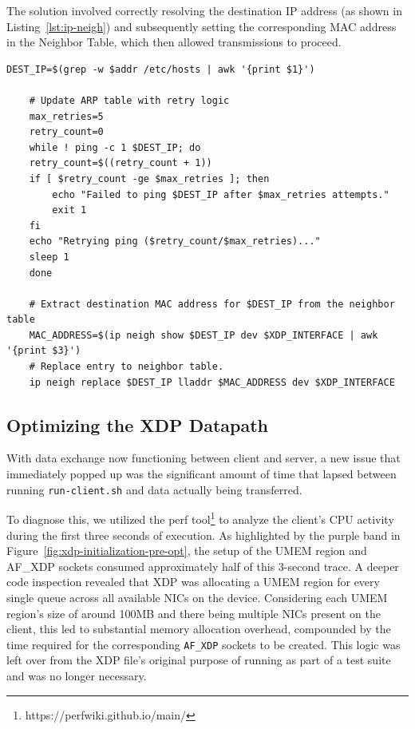 The solution involved correctly resolving the destination IP address (as shown in Listing~\ref{lst:ip-neigh}) and subsequently setting the corresponding MAC address in the Neighbor Table, which then allowed transmissions to proceed.

\begin{lstlisting}[caption={Hardcoding the IP and MAC address pair within the neighbor table}, label={lst:ip-neigh}]
    DEST_IP=$(grep -w $addr /etc/hosts | awk '{print $1}')

    # Update ARP table with retry logic
    max_retries=5
    retry_count=0
    while ! ping -c 1 $DEST_IP; do
    retry_count=$((retry_count + 1))
    if [ $retry_count -ge $max_retries ]; then
        echo "Failed to ping $DEST_IP after $max_retries attempts."
        exit 1
    fi
    echo "Retrying ping ($retry_count/$max_retries)..."
    sleep 1
    done

    # Extract destination MAC address for $DEST_IP from the neighbor table
    MAC_ADDRESS=$(ip neigh show $DEST_IP dev $XDP_INTERFACE | awk '{print $3}')
    # Replace entry to neighbor table.
    ip neigh replace $DEST_IP lladdr $MAC_ADDRESS dev $XDP_INTERFACE
\end{lstlisting}

\subsection{Optimizing the XDP Datapath}
\label{subsec:optimizing-xdp}
With data exchange now functioning between client and server, a new issue that immediately popped up was the significant amount of time that lapsed between running \texttt{run-client.sh} and data actually being transferred.

To diagnose this, we utilized the perf tool\footnote{https://perfwiki.github.io/main/} to analyze the client's \ac{CPU} activity during the first three seconds of execution. As highlighted by the purple band in Figure~\ref{fig:xdp-initialization-pre-opt}, the setup of the UMEM region and AF\_XDP sockets consumed approximately half of this 3-second trace. A deeper code inspection revealed that \ac{XDP} was allocating a UMEM region for every single queue across all available \ac{NIC}s on the device. Considering each UMEM region's size of around 100MB and there being multiple \ac{NIC}s present on the client, this led to substantial memory allocation overhead, compounded by the time required for the corresponding \texttt{AF\_XDP} sockets to be created. This logic was left over from the \ac{XDP} file's original purpose of running as part of a test suite and was no longer necessary.


